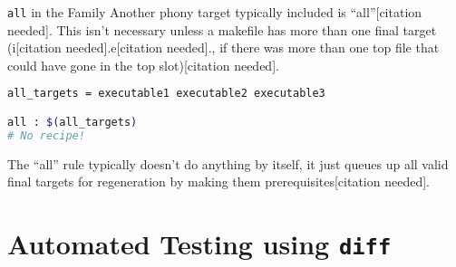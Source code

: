 \documentclass[11pt]{beamer}
\begin{document}
\begin{frame}[fragile=singleslide]{\texttt{all} in the Family}
Another phony target typically included is ``all''[citation needed].  This isn't necessary unless a makefile has more than one final target (i[citation needed].e[citation needed]., if there was more than one top file that could have gone in the top slot)[citation needed].  
\begin{lstlisting}[style = terminal, language=bash]
all_targets = executable1 executable2 executable3

all : $(all_targets)
# No recipe! 
\end{lstlisting}
The ``all'' rule typically doesn't do anything by itself, it just queues up all valid final targets for regeneration by making them prerequisites[citation needed].  
\end{frame}

\section[Testing]{Automated Testing using \texttt{diff}}
\end{document}

